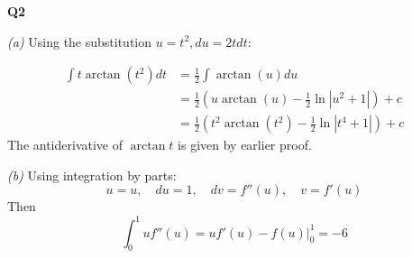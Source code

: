 \documentclass[12pt, a4paper]{article}
\begin{document}
\textbf{Q2}

\textit{(a)}
Using the substitution $u = t^2, du = 2t dt$:

\begin{align*}
    \int t \arctan(t^2)dt & =
    \frac{1}{2} \int \arctan(u)du\\
    & = \frac{1}{2} \left(
        u \arctan(u) - \frac{1}{2} \ln |u^2 + 1|
    \right) + c\\
    & = \frac{1}{2} \left(
        t^2 \arctan(t^2) - \frac{1}{2} \ln |t^4 + 1|
    \right) + c
\end{align*}
The antiderivative of $\arctan t$ is given by earlier proof.

\textit{(b)} Using integration by parts:
\[
    u = u, \quad du = 1, \quad dv = f''(u), \quad v = f'(u)
\]
Then
\[
    \int_0^1 u f''(u) =
    u f'(u) - f(u)\big\vert^1_0 = -6
\]
\end{document}
